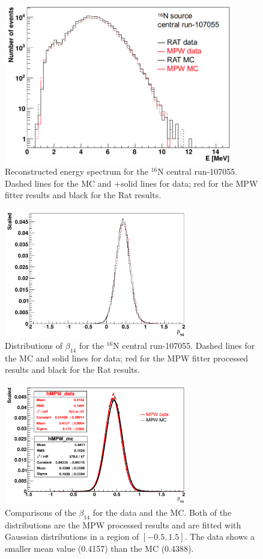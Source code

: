 \begin{figure}[htbp]
	\centering
	\includegraphics[width=10cm]{N16_reconE_107055.png}
	\caption{Reconstructed energy spectrum for the $^{16}$N central run-107055. Dashed lines for the MC and +solid lines for data; red for the MPW fitter results and black for the Rat results.}
	\label{N16energy}
\end{figure}

\begin{figure}[htbp]
	\centering
	\includegraphics[width=8cm]{N16_beta14_107055.png}
	\caption{Distributions of $\beta_{14}$ for the $^{16}$N central run-107055. Dashed lines for the MC and solid lines for data; red for the MPW fitter processed results and black for the Rat results.}
	\label{N16beta14}
\end{figure}


\begin{figure}[htbp]
	\centering
	\includegraphics[width=8cm]{N16FitMPW_beta14_107055.png}
	\caption{Comparisons of the $\beta_{14}$ for the data and the MC. Both of the distributions are the MPW processed results and are fitted with Gaussian distributions in a region of $[-0.5,1.5]$. The data shows a smaller mean value (0.4157) than the MC (0.4388).}
	\label{N16beta14MPW}
\end{figure}

